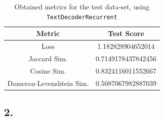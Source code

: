 \documentclass[11pt]{article}
\begin{document}
\begin{table}[H]
    \centering
    \begin{tabular}{cc}
        \toprule
        \textbf{Metric}          & \textbf{Test Score} \\
        \midrule
        Loss                     & 1.182828904652014   \\
        Jaccard Sim.             & 0.7149178437842456  \\
        Cosine Sim.              & 0.8324116011552667  \\
        Damerau-Levenshtein Sim. & 0.5087067982887039  \\
        \bottomrule
    \end{tabular}
    \caption{Obtained metrics for the test data-set, using \texttt{TextDecoderRecurrent}}
\end{table}

\subsection*{2.}
\end{document}
